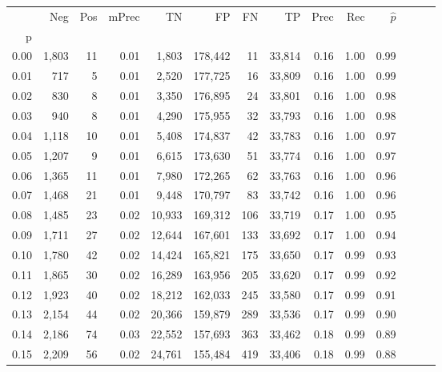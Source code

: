 \begin{tabular}{rrrrrrrrrrrrrr}
\toprule
{} &    Neg &  Pos & mPrec &       TN &       FP &      FN &      TP &  Prec &   Rec & $\hat{p}$ \\
p    &        &      &       &          &          &         &         &       &       &           \\
\midrule
0.00 &  1,803 &   11 &  0.01 &    1,803 &  178,442 &      11 &  33,814 &  0.16 &  1.00 &      0.99 \\
0.01 &    717 &    5 &  0.01 &    2,520 &  177,725 &      16 &  33,809 &  0.16 &  1.00 &      0.99 \\
0.02 &    830 &    8 &  0.01 &    3,350 &  176,895 &      24 &  33,801 &  0.16 &  1.00 &      0.98 \\
0.03 &    940 &    8 &  0.01 &    4,290 &  175,955 &      32 &  33,793 &  0.16 &  1.00 &      0.98 \\
0.04 &  1,118 &   10 &  0.01 &    5,408 &  174,837 &      42 &  33,783 &  0.16 &  1.00 &      0.97 \\
0.05 &  1,207 &    9 &  0.01 &    6,615 &  173,630 &      51 &  33,774 &  0.16 &  1.00 &      0.97 \\
0.06 &  1,365 &   11 &  0.01 &    7,980 &  172,265 &      62 &  33,763 &  0.16 &  1.00 &      0.96 \\
0.07 &  1,468 &   21 &  0.01 &    9,448 &  170,797 &      83 &  33,742 &  0.16 &  1.00 &      0.96 \\
0.08 &  1,485 &   23 &  0.02 &   10,933 &  169,312 &     106 &  33,719 &  0.17 &  1.00 &      0.95 \\
0.09 &  1,711 &   27 &  0.02 &   12,644 &  167,601 &     133 &  33,692 &  0.17 &  1.00 &      0.94 \\
0.10 &  1,780 &   42 &  0.02 &   14,424 &  165,821 &     175 &  33,650 &  0.17 &  0.99 &      0.93 \\
0.11 &  1,865 &   30 &  0.02 &   16,289 &  163,956 &     205 &  33,620 &  0.17 &  0.99 &      0.92 \\
0.12 &  1,923 &   40 &  0.02 &   18,212 &  162,033 &     245 &  33,580 &  0.17 &  0.99 &      0.91 \\
0.13 &  2,154 &   44 &  0.02 &   20,366 &  159,879 &     289 &  33,536 &  0.17 &  0.99 &      0.90 \\
0.14 &  2,186 &   74 &  0.03 &   22,552 &  157,693 &     363 &  33,462 &  0.18 &  0.99 &      0.89 \\
0.15 &  2,209 &   56 &  0.02 &   24,761 &  155,484 &     419 &  33,406 &  0.18 &  0.99 &      0.88 \\

\end{tabular}
